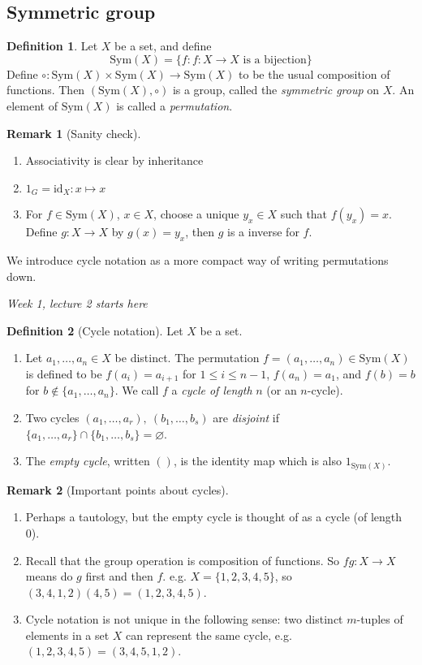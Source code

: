 \documentclass[a4paper]{article}
\newcommand{\Sym}{\text{Sym}}
\newcommand{\id}{\text{id}}
\theoremstyle{definition}
\newtheorem{defn}{Definition}[subsection]
\newtheorem*{remark}{Remark}
\begin{document}
\subsection{Symmetric group}
\begin{defn}
Let $X$ be a set, and define
\[
\Sym(X) = \{f:f:X\rightarrow X \text{ is a bijection}\}
\]
Define $\circ:\Sym(X)\times \Sym(X)\rightarrow \Sym(X)$ to be the usual composition of functions. Then $(\Sym(X),\circ)$ is a group, called the \textit{symmetric group} on $X$. An element of $\Sym(X)$ is called a \textit{permutation}. 
\end{defn}

\begin{remark}[Sanity check]
\begin{enumerate}
\item Associativity is clear by inheritance
\item $1_G=\id_X : x\mapsto x$
\item For $f\in \Sym(X)$, $x\in X$, choose a unique $y_x\in X$ such that $f(y_x)=x$. Define $g:X\rightarrow X$ by $g(x)=y_x$, then $g$ is a inverse for $f$.
\end{enumerate}
\end{remark}

We introduce cycle notation as a more compact way of writing permutations down.

\begin{flushright}
\textit{Week 1, lecture 2 starts here}
\end{flushright}

\begin{defn}[Cycle notation]
Let $X$ be a set.
\begin{enumerate}
\item Let $a_1,\ldots,a_n\in X$ be distinct. The permutation $f=(a_1,\ldots,a_n) \in\Sym(X)$ is defined to be $f(a_i)=a_{i+1}$ for $1\leq i\leq n-1$, $f(a_{n})=a_1$, and $f(b)=b$ for $b\not\in \{a_1,\ldots,a_n\}$. We call $f$ a \textit{cycle of length} $n$ (or an $n$-cycle).
\item Two cycles $(a_1,\ldots,a_r),\ (b_1,\ldots,b_s)$ are \textit{disjoint} if $\{a_1,\ldots,a_r\} \cap \{b_1,\ldots,b_s\}=\varnothing$.
\item The \textit{empty cycle}, written $()$, is the identity map which is also $1_{\Sym(X)}$.
\end{enumerate}
\end{defn}
\begin{remark}[Important points about cycles]
\begin{enumerate}
\item Perhaps a tautology, but the empty cycle is thought of as a cycle (of length 0).
\item Recall that the group operation is composition of functions. So $fg:X\rightarrow X$ means do $g$ first and then $f$. e.g. $X=\{1,2,3,4,5\}$, so $(3,4,1,2)(4,5)=(1,2,3,4,5)$.
\item Cycle notation is not unique in the following sense: two distinct $m$-tuples of elements in a set $X$ can represent the same cycle, e.g. $(1,2,3,4,5)=(3,4,5,1,2)$.
\end{enumerate}
\end{remark}
\end{document}
